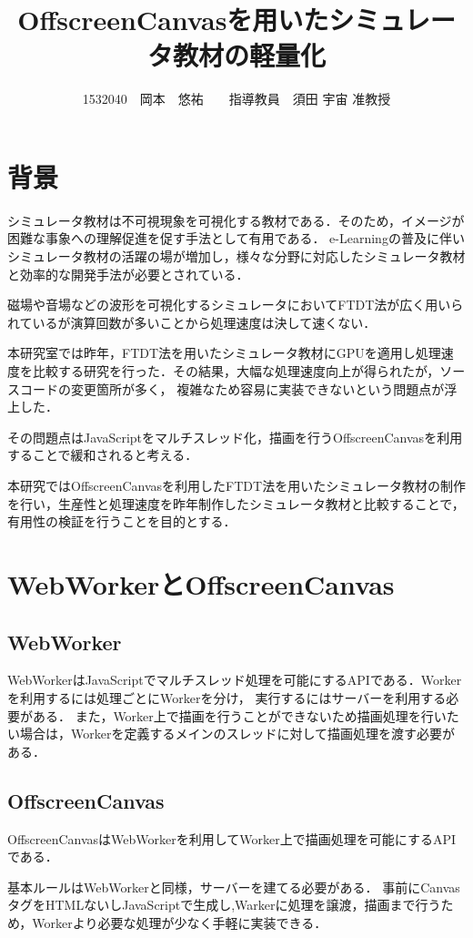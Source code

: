 \documentclass[twocolumn,10pt,a4j]{jsarticle}
\title{OffscreenCanvasを用いたシミュレータ教材の軽量化}
\author{1532040　岡本　悠祐　　指導教員　須田 宇宙 准教授}
\date{}
\begin{document}
\maketitle
\section{背景}
シミュレータ教材は不可視現象を可視化する教材である．そのため，イメージが困難な事象への理解促進を促す手法として有用である．
e-Learningの普及に伴いシミュレータ教材の活躍の場が増加し，様々な分野に対応したシミュレータ教材と効率的な開発手法が必要とされている．

磁場や音場などの波形を可視化するシミュレータにおいてFTDT法が広く用いられているが演算回数が多いことから処理速度は決して速くない．

本研究室では昨年，FTDT法を用いたシミュレータ教材にGPUを適用し処理速度を比較する研究を行った．その結果，大幅な処理速度向上が得られたが，ソースコードの変更箇所が多く，
複雑なため容易に実装できないという問題点が浮上した．

その問題点はJavaScriptをマルチスレッド化，描画を行うOffscreenCanvasを利用することで緩和されると考える．

本研究ではOffscreenCanvasを利用したFTDT法を用いたシミュレータ教材の制作を行い，生産性と処理速度を昨年制作したシミュレータ教材と比較することで，有用性の検証を行うことを目的とする．

\section{WebWorkerとOffscreenCanvas}
\subsection{WebWorker}
WebWorkerはJavaScriptでマルチスレッド処理を可能にするAPIである．Workerを利用するには処理ごとにWorkerを分け，
実行するにはサーバーを利用する必要がある．
また，Worker上で描画を行うことができないため描画処理を行いたい場合は，Workerを定義するメインのスレッドに対して描画処理を渡す必要がある．

\subsection{OffscreenCanvas}
OffscreenCanvasはWebWorkerを利用してWorker上で描画処理を可能にするAPIである．

基本ルールはWebWorkerと同様，サーバーを建てる必要がある．
事前にCanvasタグをHTMLないしJavaScriptで生成し,Warkerに処理を譲渡，描画まで行うため，Workerより必要な処理が少なく手軽に実装できる．
\end{document}
